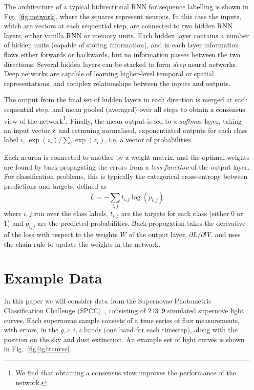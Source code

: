 \documentclass[twocolumn]{aastex61}
\begin{document}
The architecture of a typical bidirectional RNN for sequence labelling is shown in Fig.~\ref{fig:network}, where the squares represent {\rm neurons}. In this case the inputs, which are vectors at each sequential step, are connected to two hidden RNN layers, either vanilla RNN or memory units.  Each hidden layer contains a number of hidden units (capable of storing information), and in each layer information flows either forwards or backwards,  but no information passes between the two directions. Several hidden layers can be stacked to form {\em deep} neural networks. Deep networks are capable of learning higher-level temporal or spatial representations, and complex relationships between the inputs and outputs.

The output from the final set of hidden layers in each direction is merged at each sequential step, and mean pooled (averaged) over all steps to obtain a consensus view of the network\footnote{We find that obtaining a consensus view improves the performance of the network.}. Finally, the mean output is fed to a {\em softmax} layer, taking an input vector ${\bf z}$ and returning normalised, exponentiated outputs for each class label $i$, $\exp(z_i) / \sum_{i} \exp(z_i)$, i.e. a vector of probabilities.

 Each neuron is connected to another by a weight matrix, and the optimal weights are found by back-propagating the errors from a {\em loss function} of the output layer. For classification problems, this is typically the categorical cross-entropy between predictions and targets, defined as 
\begin{equation}
L= -\sum_{i,j} t_{i,j} \log \left( p_{i,j} \right)
\end{equation}
where $i,j$ run over the class labels, $t_{i,j}$ are the targets for each class (either 0 or 1) and $p_{i,j}$ are the predicted probabilities. Back-propogation takes the derivative of the loss with respect to the weights $W$ of the output layer, $\partial L/\partial W$, and uses the chain rule to update the weights in the network.

\section{Example Data}

In this paper we will consider data from the Supernovae Photometric Classification Challenge (SPCC)~\cite{Kessler:2010wk,Kessler:2010qj}, consisting of 21319 simulated supernove light curves.  Each supernovae sample consists of a time series of flux measurements, with errors, in the $g,r,i,z$ bands (one band for each timestep), along with the position on the sky and dust extinction. An example set of light curves is shown in Fig.~\ref{fig:lightcurve}. 
\end{document}
